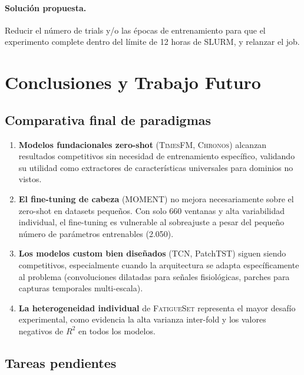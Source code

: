 \documentclass[12pt, a4paper]{article}
\newcommand{\fatigueset}{\textsc{FatigueSet}}
\newcommand{\moment}{\textsc{MOMENT}}
\newcommand{\chronos}{\textsc{Chronos}}
\newcommand{\timesfm}{\textsc{TimesFM}}
\begin{document}
\paragraph{Solución propuesta.}
Reducir el número de trials y/o las épocas de entrenamiento para que el experimento complete dentro del límite de 12 horas de SLURM, y relanzar el job.


\section{Conclusiones y Trabajo Futuro}
\label{sec:conclusiones}

\subsection{Comparativa final de paradigmas}

\begin{enumerate}
    \item \textbf{Modelos fundacionales zero-shot} (\timesfm{}, \chronos{}) alcanzan resultados competitivos sin necesidad de entrenamiento específico, validando su utilidad como extractores de características universales para dominios no vistos.

    \item \textbf{El fine-tuning de cabeza} (\moment{}) no mejora necesariamente sobre el zero-shot en datasets pequeños. Con solo 660 ventanas y alta variabilidad individual, el fine-tuning es vulnerable al sobreajuste a pesar del pequeño número de parámetros entrenables (2.050).

    \item \textbf{Los modelos custom bien diseñados} (TCN, PatchTST) siguen siendo competitivos, especialmente cuando la arquitectura se adapta específicamente al problema (convoluciones dilatadas para señales fisiológicas, parches para capturas temporales multi-escala).

    \item \textbf{La heterogeneidad individual} de \fatigueset{} representa el mayor desafío experimental, como evidencia la alta varianza inter-fold y los valores negativos de $R^2$ en todos los modelos.
\end{enumerate}

\subsection{Tareas pendientes}
\end{document}

